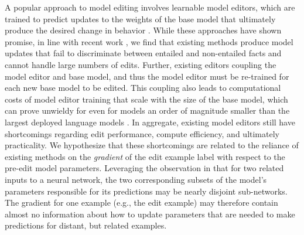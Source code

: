 A popular approach to model editing involves learnable model editors, which are trained to predict updates to the weights of the base model that ultimately produce the desired change in behavior \citep{Sinitsin2020Editable,Cao2021EditingFK,mitchell2021fast,hase2021language}. While these approaches have shown promise, in line with recent work \citep{hase2021language}, we find that existing methods produce model updates that fail to discriminate between entailed and non-entailed facts
and cannot handle large numbers of edits. Further, existing editors coupling 
the model editor and base model, and thus the model editor must be re-trained for each new base model to be edited. This coupling also leads to computational costs of model editor training that scale with the size of the base model, which can prove unwieldy for even for models an order of magnitude smaller than the largest deployed language models \citep{mitchell2021fast}. In aggregate, existing model editors still have shortcomings regarding edit performance, compute efficiency, and ultimately practicality. We hypothesize that these shortcomings are related to the reliance of existing methods on the \textit{gradient} of the edit example label with respect to the pre-edit model parameters. Leveraging the observation in \citet{csordas2021are} that for two related inputs to a neural network, the two corresponding subsets of the model's parameters responsible for its predictions may be nearly disjoint sub-networks.
The gradient for one example (e.g., the edit example) may therefore contain almost no information about how to update parameters that are needed to make predictions for distant, but related examples.



